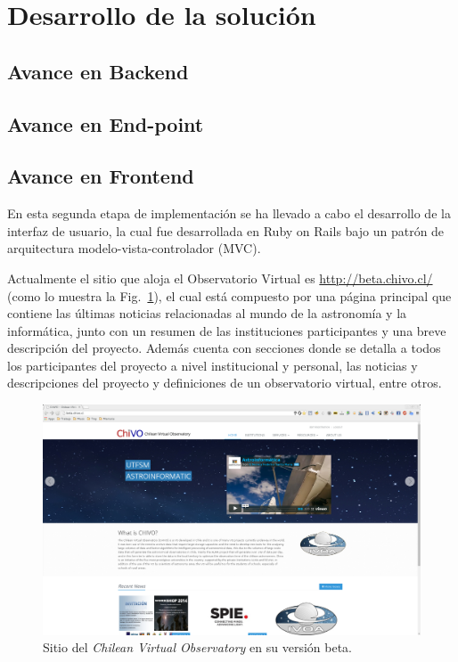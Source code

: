 \section{Desarrollo de la solución}

\subsection{Avance en Backend}

\subsection{Avance en End-point}

\subsection{Avance en Frontend}

En esta segunda etapa de implementación se ha llevado a cabo el
desarrollo de la interfaz de usuario, la cual fue desarrollada en
Ruby on Rails bajo un patrón de arquitectura modelo-vista-controlador
(MVC).

Actualmente el sitio que aloja el Observatorio Virtual es
\url{http://beta.chivo.cl/} (como lo muestra la Fig.~\ref{img:chivo}),
el cual está compuesto por una página principal que contiene las
últimas noticias relacionadas al mundo de la astronomía y la
informática, junto con un resumen de las instituciones participantes y
una breve descripción del proyecto. Además cuenta con secciones donde
se detalla a todos los participantes del proyecto a nivel
institucional y personal, las noticias y descripciones del proyecto y
definiciones de un observatorio virtual, entre otros.

\begin{figure}[ht!]
    \begin{center}
	\includegraphics[scale=.2]{img/chivo}
    \end{center}
    \caption{Sitio del \emph{Chilean Virtual Observatory} en su
      versión beta.}\label{img:chivo}
\end{figure}

